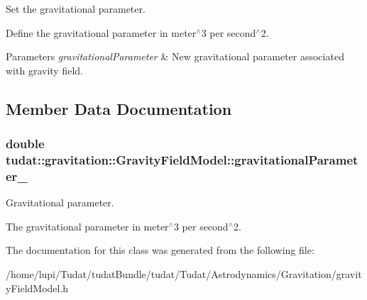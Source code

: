 Set the gravitational parameter. 

Define the gravitational parameter in meter$^\wedge$3 per second$^\wedge$2. 
\begin{DoxyParams}{Parameters}
{\em gravitational\+Parameter} & New gravitational parameter associated with gravity field. \\
\hline
\end{DoxyParams}


\subsection{Member Data Documentation}
\subsubsection[{\texorpdfstring{gravitational\+Parameter\+\_\+}{gravitationalParameter_}}]{\setlength{\rightskip}{0pt plus 5cm}double tudat\+::gravitation\+::\+Gravity\+Field\+Model\+::gravitational\+Parameter\+\_\+\hspace{0.3cm}{\ttfamily [protected]}}\hypertarget{classtudat_1_1gravitation_1_1GravityFieldModel_a09f7494a3ec50394da0bfd859473d546}{}\label{classtudat_1_1gravitation_1_1GravityFieldModel_a09f7494a3ec50394da0bfd859473d546}


Gravitational parameter. 

The gravitational parameter in meter$^\wedge$3 per second$^\wedge$2. 

The documentation for this class was generated from the following file\+:\begin{DoxyCompactItemize}
\item 
/home/lupi/\+Tudat/tudat\+Bundle/tudat/\+Tudat/\+Astrodynamics/\+Gravitation/gravity\+Field\+Model.\+h\end{DoxyCompactItemize}

